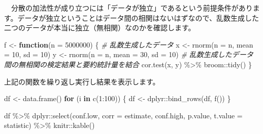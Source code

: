 \documentclass[]{tufte-handout}
\newenvironment{Shaded}{}{}
\newcommand{\AttributeTok}[1]{\textcolor[rgb]{0.49,0.56,0.16}{#1}}
\newcommand{\CommentTok}[1]{\textcolor[rgb]{0.38,0.63,0.69}{\textit{#1}}}
\newcommand{\ControlFlowTok}[1]{\textcolor[rgb]{0.00,0.44,0.13}{\textbf{#1}}}
\newcommand{\DecValTok}[1]{\textcolor[rgb]{0.25,0.63,0.44}{#1}}
\newcommand{\FunctionTok}[1]{\textcolor[rgb]{0.02,0.16,0.49}{#1}}
\newcommand{\NormalTok}[1]{#1}
\newcommand{\OtherTok}[1]{\textcolor[rgb]{0.00,0.44,0.13}{#1}}
\newcommand{\SpecialCharTok}[1]{\textcolor[rgb]{0.25,0.44,0.63}{#1}}
\begin{document}
　分散の加法性が成り立つには「データが独立」であるという前提条件があります。データが独立ということはデータ間の相関はないはずなので、乱数生成した二つのデータが本当に独立（無相関）なのかを確認します。

\begin{Shaded}
\begin{Highlighting}[numbers=left,,]
\NormalTok{f }\OtherTok{\textless{}{-}} \ControlFlowTok{function}\NormalTok{(}\AttributeTok{n =} \DecValTok{5000000}\NormalTok{) \{}
  \CommentTok{\# 乱数生成したデータ}
\NormalTok{  x }\OtherTok{\textless{}{-}} \FunctionTok{rnorm}\NormalTok{(}\AttributeTok{n =}\NormalTok{ n, }\AttributeTok{mean =} \DecValTok{10}\NormalTok{, }\AttributeTok{sd =} \DecValTok{10}\NormalTok{)}
\NormalTok{  y }\OtherTok{\textless{}{-}} \FunctionTok{rnorm}\NormalTok{(}\AttributeTok{n =}\NormalTok{ n, }\AttributeTok{mean =} \DecValTok{30}\NormalTok{, }\AttributeTok{sd =} \DecValTok{10}\NormalTok{)}
  \CommentTok{\# 乱数生成したデータ間の無相関の検定結果と要約統計量を結合}
  \FunctionTok{cor.test}\NormalTok{(x, y) }\SpecialCharTok{\%\textgreater{}\%}\NormalTok{ broom}\SpecialCharTok{::}\FunctionTok{tidy}\NormalTok{()}
\NormalTok{\}}
\end{Highlighting}
\end{Shaded}

上記の関数を繰り返し実行し結果を表示します。

\begin{Shaded}
\begin{Highlighting}[numbers=left,,]
\NormalTok{df }\OtherTok{\textless{}{-}} \FunctionTok{data.frame}\NormalTok{()}
\ControlFlowTok{for}\NormalTok{ (i }\ControlFlowTok{in} \FunctionTok{c}\NormalTok{(}\DecValTok{1}\SpecialCharTok{:}\DecValTok{100}\NormalTok{)) \{}
\NormalTok{  df }\OtherTok{\textless{}{-}}\NormalTok{ dplyr}\SpecialCharTok{::}\FunctionTok{bind\_rows}\NormalTok{(df, }\FunctionTok{f}\NormalTok{())}
\NormalTok{\}}

\NormalTok{df }\SpecialCharTok{\%\textgreater{}\%} 
\NormalTok{  dplyr}\SpecialCharTok{::}\FunctionTok{select}\NormalTok{(conf.low, }\AttributeTok{corr =}\NormalTok{ estimate, conf.high,}
\NormalTok{                p.value, }\AttributeTok{t.value =}\NormalTok{ statistic) }\SpecialCharTok{\%\textgreater{}\%} 
\NormalTok{  knitr}\SpecialCharTok{::}\FunctionTok{kable}\NormalTok{()}
\end{Highlighting}
\end{Shaded}
\end{document}
